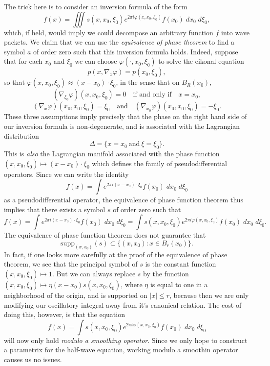 \documentclass{article}
\theoremstyle{plain}
\theoremstyle{remark}
\theoremstyle{definition}
\begin{document}
The trick here is to consider an inversion formula of the form
%
\[ f(x) = \iiint s(x,x_0,\xi_0) e^{2 \pi i \varphi(x,x_0,\xi_0)} f(x_0)\; dx_0\; d\xi_0, \]
%
which, if held, would imply we could decompose an arbitrary function $f$ into wave packets. We claim that we can use the \emph{equivalence of phase theorem} to find a symbol $a$ of order zero such that this inversion formula holds. Indeed, suppose that for each $x_0$ and $\xi_0$ we can choose $\varphi(\cdot,x_0,\xi_0)$ to solve the eikonal equation
%
\[ p(x,\nabla_x \varphi) = p(x_0,\xi_0), \]
%
so that $\varphi(x,x_0,\xi_0) \approx (x - x_0) \cdot \xi_0$, in the sense that on $B_R(x_0)$,
%
\[ (\nabla_{\xi_0} \varphi)(x,x_0,\xi_0) = 0 \quad\text{if and only if}\quad x = x_0, \]
%
\[ (\nabla_x \varphi)(x_0,x_0,\xi_0) = \xi_0 \quad\text{and}\quad (\nabla_{x_0} \varphi)(x_0,x_0,\xi_0) = - \xi_0. \]
%
These three assumptions imply precisely that the phase on the right hand side of our inversion formula is non-degenerate, and is associated with the Lagrangian distribution
%
\[ \Delta = \Big\{ x = x_0\ \text{and}\ \xi = \xi_0 \Big\}. \]
%
This is \emph{also} the Lagrangian manifold associated with the phase function $(x,x_0,\xi_0) \mapsto (x - x_0) \cdot \xi_0$ which defines the family of pseudodifferential operators. Since we can write the identity
%
\[ f(x) = \int e^{2 \pi i (x - x_0) \cdot \xi_0} f(x_0)\; dx_0\; d\xi_0 \]
%
as a pseudodifferential operator, the equivalence of phase function theorem thus implies that there exists a symbol $s$ of order zero such that
%
\[ f(x) = \int e^{2 \pi i (x - x_0) \cdot \xi_0} f(x_0)\; dx_0\; d\xi_0 = \int s(x,x_0,\xi_0) e^{2 \pi i \varphi(x,x_0,\xi_0)} f(x_0)\; dx_0\; d\xi_0. \]
%
The equivalence of phase function theorem does not guarantee that
%
\[ \text{supp}_{(x,x_0)}(s) \subset \{ (x,x_0) : x \in B_r(x_0) \}. \]
%
In fact, if one looks more carefully at the proof of the equivalence of phase theorem, we see that the principal symbol of $s$ is the constant function $(x,x_0,\xi_0) \mapsto 1$. But we can always replace $s$ by the function $(x,x_0,\xi_0) \mapsto \eta(x - x_0) s(x,x_0,\xi_0)$, where $\eta$ is equal to one in a neighborhood of the origin, and is supported on $|x| \leq r$, because then we are only modifying our oscillatory integral away from it's canonical relation. The cost of doing this, however, is that the equation
%
\[ f(x) = \int s(x,x_0,\xi_0) e^{2 \pi i \varphi(x,x_0,\xi_0)} f(x_0)\; dx_0\; d\xi_0 \]
%
will now only hold \emph{modulo a smoothing operator}. Since we only hope to construct a parametrix for the half-wave equation, working modulo a smoothin operator causes us no issues.
\end{document}
